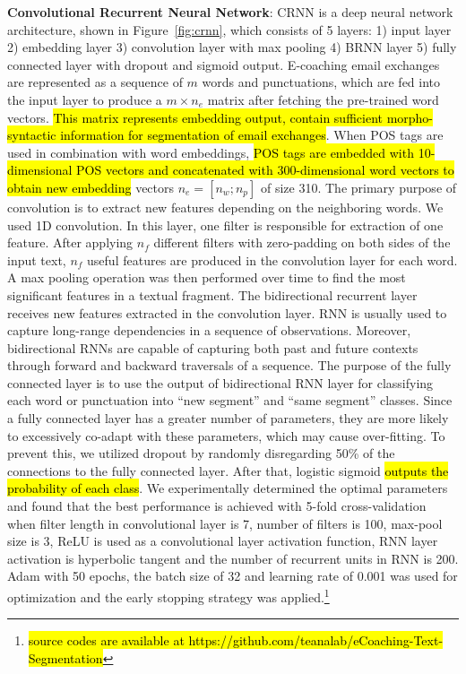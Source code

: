 \documentclass{amia}
\begin{document}
\textbf{Convolutional Recurrent Neural Network}: CRNN is a deep neural network architecture,\cite{treviso2017sentence} shown in Figure~\ref{fig:crnn}, which consists of 5 layers: 1) input layer 2) embedding layer 3) convolution layer with max pooling 4) BRNN layer 5) fully connected layer with dropout and sigmoid output. E-coaching email exchanges are represented as a sequence of $m$ words and punctuations, which are fed into the input layer to produce a $m \times n_e$ matrix after fetching the pre-trained word vectors. \hl{This matrix represents embedding output, contain sufficient morpho-syntactic information for segmentation of email exchanges}. When POS tags are used in combination with word embeddings, \hl{POS tags are embedded with 10-dimensional POS vectors and concatenated with 300-dimensional word vectors to obtain new embedding} vectors $n_e = [n_w;n_p]$ of size 310. The primary purpose of convolution is to extract new features depending on the neighboring words. We used 1D convolution. In this layer, one filter is responsible for extraction of one feature. After applying $n_f$ different filters with zero-padding on both sides of the input text, $n_f$ useful features are produced in the convolution layer for each word. A max pooling operation was then performed over time to find the most significant features in a textual fragment. The bidirectional recurrent layer receives new features extracted in the convolution layer. RNN is usually used to capture long-range dependencies in a sequence of observations. Moreover, bidirectional RNNs are capable of capturing both past and future contexts through forward and backward traversals of a sequence. The purpose of the fully connected layer is to use the output of bidirectional RNN layer for classifying each word or punctuation into ``new segment'' and ``same segment'' classes. Since a fully connected layer has a greater number of parameters, they are more likely to excessively co-adapt with these parameters, which may cause over-fitting. To prevent this, we utilized dropout by randomly disregarding 50\% of the connections to the fully connected layer. After that, logistic sigmoid \hl{outputs the probability of each class}. We experimentally determined the optimal parameters and found that the best performance is achieved with 5-fold cross-validation when filter length in convolutional layer is 7, number of filters is 100, max-pool size is 3, ReLU is used as a convolutional layer activation function, RNN layer activation is hyperbolic tangent and the number of recurrent units in RNN is 200. Adam\cite{kingma2014adam} with 50 epochs, the batch size of 32 and learning rate of 0.001 was used for optimization and the early stopping strategy was applied.\footnote{\hl{source codes are available at https://github.com/teanalab/eCoaching-Text-Segmentation}}
\end{document}
